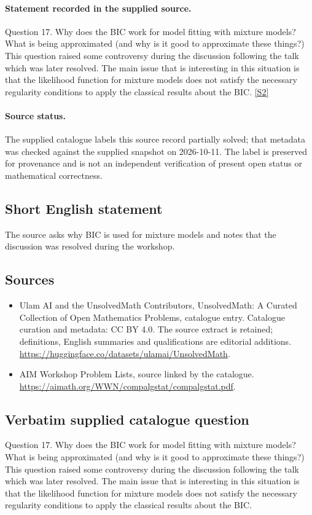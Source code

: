 \documentclass[11pt]{article}
\begin{document}
\paragraph{Statement recorded in the supplied source.}
Question 17. Why does the BIC work for model fitting with mixture models? What is being approximated (and why is it good to approximate these things?) This question raised some controversy during the discussion following the talk which was later resolved. The main issue that is interesting in this situation is that the likelihood function for mixture models does not satisfy the necessary regularity conditions to apply the classical results about the BIC. \href{https://aimath.org/WWN/compalgstat/compalgstat.pdf}{[S2]}
\paragraph{Source status.}
The supplied catalogue labels this source record partially solved; that metadata was checked against the supplied snapshot on 2026-10-11. The label is preserved for provenance and is not an independent verification of present open status or mathematical correctness.
\subsection{Short English statement}
The source asks why BIC is used for mixture models and notes that the discussion was resolved during the workshop.
\subsection{Sources}
\begin{itemize}
\item[S1] Ulam AI and the UnsolvedMath Contributors, UnsolvedMath: A Curated Collection of Open Mathematics Problems, catalogue entry. Catalogue curation and metadata: CC BY 4.0. The source extract is retained; definitions, English summaries and qualifications are editorial additions.
\url{https://huggingface.co/datasets/ulamai/UnsolvedMath}.
\item[S2] AIM Workshop Problem Lists, source linked by the catalogue.
\url{https://aimath.org/WWN/compalgstat/compalgstat.pdf}.
\end{itemize}
\subsection{Verbatim supplied catalogue question}
Question 17. Why does the BIC work for model fitting with mixture models? What is being approximated (and why is it good to approximate these things?) This question raised some controversy during the discussion following the talk which was later resolved. The main issue that is interesting in this situation is that the likelihood function for mixture models does not satisfy the necessary regularity conditions to apply the classical results about the BIC.
\end{document}
